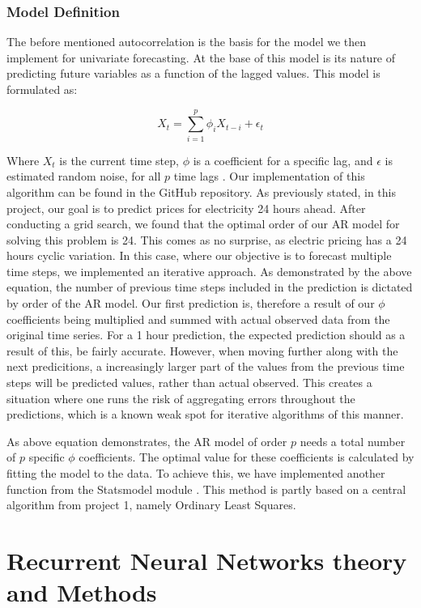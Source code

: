\documentclass
[twocolumn,
secnumarabic,
nobibnotes,
aps,
prl,
reprint,
groupedaddress,
amsmath,
amssymb,
]{revtex4-2}
\begin{document}
\subsubsection{Model Definition}

The before mentioned autocorrelation is the basis for the model we then implement for univariate forecasting. At the base of this model is its nature of predicting future variables as a function of the lagged values. This model is formulated as:

\[
X_t = \sum_{i=1}^{p} \phi_i X_{t-i} + \epsilon_{t}
\]

Where $X_t$ is the current time step, $\phi$ is a coefficient for a specific lag, and $\epsilon$ is estimated random noise, for all $p$ time lags \cite{Korstanje2021}. Our implementation of this algorithm can be found in the GitHub repository. As previously stated, in this project, our goal is to predict prices for electricity 24 hours ahead. After conducting a grid search, we found that the optimal order of our AR model for solving this problem is 24. This comes as no surprise, as electric pricing has a 24 hours cyclic variation. In this case, where our objective is to forecast multiple time steps, we implemented an iterative approach. As demonstrated by the above equation, the number of previous time steps included in the prediction is dictated by order of the AR model. Our first prediction is, therefore a result of our $\phi$ coefficients being multiplied and summed with actual observed data from the original time series. For a 1 hour prediction, the expected prediction should as a result of this, be fairly accurate. However, when moving further along with the next predicitions, a increasingly larger part of the values from the previous time steps will be predicted values, rather than actual observed. This creates a situation where one runs the risk of aggregating errors throughout the predictions, which is a known weak spot for iterative algorithms of this manner. 

As above equation demonstrates, the AR model of order $p$ needs a total number of $p$ specific $\phi$ coefficients. The optimal value for these coefficients is calculated by fitting the model to the data. To achieve this, we have implemented another function from the Statsmodel module \cite{seabold2010statsmodels}. This method is partly based on a central algorithm from project 1, namely Ordinary Least Squares\cite{Korstanje2021}.

\section{Recurrent Neural Networks theory and Methods}
\end{document}
